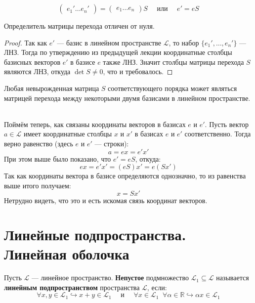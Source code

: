\documentclass[11pt]{article}
\begin{document}
\begin{equation*}
    \begin{pmatrix}
        e_1' \ldots e_n'
    \end{pmatrix}
    =
    \begin{pmatrix}
        e_1 \ldots e_n
    \end{pmatrix}
    S
    \quad \text{ или } \quad 
    e' = eS
\end{equation*}

\begin{lemma}
    Определитель матрицы перехода отличен от нуля.
\end{lemma}

\begin{proof}
    Так как $e'$ --- базис в линейном пространстве $\mathcal{L}$, то набор $\{e_1', \ldots, e_n'\}$ --- ЛНЗ. Тогда по утверждению 
    из предыдущей лекции координатные столбцы базисных векторов $e'$ в базисе $e$ также ЛНЗ. Значит столбцы матрицы перехода $S$ являются ЛНЗ, 
    откуда $\det S \neq 0$, что и требовалось.
\end{proof}

\begin{lemma}
    Любая невырожденная матрица $S$ соответствующего порядка может являться матрицей перехода 
    между некоторыми двумя базисами в линейном пространстве.
\end{lemma} \leavevmode
\\
Поймём теперь, как связаны координаты векторов в базисах $e$ и $e'$. Пусть вектор $a \in \mathcal{L}$ 
имеет координатные столбцы $x$ и $x'$ в базисах $e$ и $e'$ соответственно. Тогда верно равенство (здесь $e$ и $e'$ --- строки):
\[a = ex = e'x'\]
При этом выше было показано, что $e' = eS$, откуда:
\[ex = e'x' = (eS)x' = e (Sx')\]
Так как координаты вектора в базисе определяются однозначно, то из равенства выше итого получаем:
\[x = Sx'\]
Нетрудно видеть, что это и есть искомая связь координат векторов.

\section{Линейные подпространства. Линейная оболочка}

\begin{definition}
    Пусть $\mathcal{L}$ --- линейное пространство. \textbf{Непустое} подмножество $\mathcal{L}_1 \subseteq \mathcal{L}$ называется 
    \textbf{линейным подпространством} пространства $\mathcal{L}$, если:
    \[\forall x, y \in \mathcal{L}_1 \hookrightarrow x + y \in \mathcal{L}_1 \quad \text{ и } \quad \forall x \in \mathcal{L}_1 \; \; \forall \alpha \in \mathbb{R} \hookrightarrow \alpha x \in \mathcal{L}_1\]
\end{definition}
\end{document}
